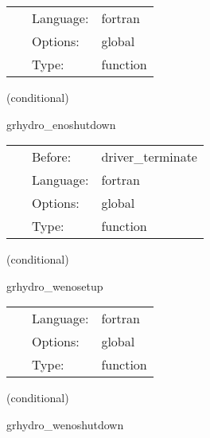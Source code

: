 \hspace{5mm}

 \begin{tabular*}{160mm}{cll} 
~ & Language:  & fortran \\ 
~ & Options:  & global \\ 
~ & Type:  & function \\ 
\end{tabular*} 


\vspace{5mm}

   (conditional) 

\hspace{5mm} grhydro\_enoshutdown 

\hspace{5mm}{\it deallocate eno coefficients } 


\hspace{5mm}

 \begin{tabular*}{160mm}{cll} 
~ & Before:  & driver\_terminate \\ 
~ & Language:  & fortran \\ 
~ & Options:  & global \\ 
~ & Type:  & function \\ 
\end{tabular*} 


\vspace{5mm}

   (conditional) 

\hspace{5mm} grhydro\_wenosetup 

\hspace{5mm}{\it coefficients for weno reconstruction } 


\hspace{5mm}

 \begin{tabular*}{160mm}{cll} 
~ & Language:  & fortran \\ 
~ & Options:  & global \\ 
~ & Type:  & function \\ 
\end{tabular*} 


\vspace{5mm}

   (conditional) 

\hspace{5mm} grhydro\_wenoshutdown 

